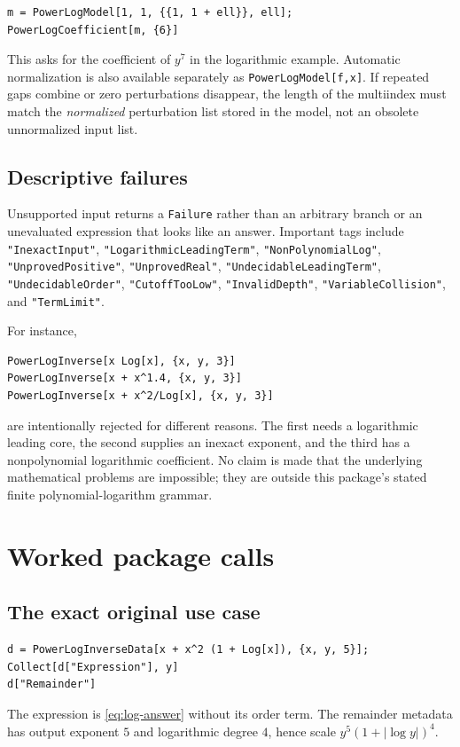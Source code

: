 \documentclass[11pt,a4paper]{article}
\theoremstyle{definition}
\theoremstyle{remark}
\newcommand{\code}[1]{\texttt{#1}}
\begin{document}
\begin{lstlisting}
m = PowerLogModel[1, 1, {{1, 1 + ell}}, ell];
PowerLogCoefficient[m, {6}]
\end{lstlisting}
This asks for the coefficient of $y^7$ in the logarithmic example. Automatic
normalization is also available separately as \code{PowerLogModel[f,x]}.
If repeated gaps combine or zero perturbations disappear, the length of the
multiindex must match the \emph{normalized} perturbation list stored in the
model, not an obsolete unnormalized input list.

\subsection{Descriptive failures}

Unsupported input returns a \code{Failure} rather than an arbitrary branch or
an unevaluated expression that looks like an answer. Important tags include
\code{"InexactInput"}, \code{"LogarithmicLeadingTerm"},
\code{"NonPolynomialLog"}, \code{"UnprovedPositive"},
\code{"UnprovedReal"}, \code{"UndecidableLeadingTerm"},
\code{"UndecidableOrder"}, \code{"CutoffTooLow"},
\code{"InvalidDepth"}, \code{"VariableCollision"}, and
\code{"TermLimit"}.

For instance,
\begin{lstlisting}
PowerLogInverse[x Log[x], {x, y, 3}]
PowerLogInverse[x + x^1.4, {x, y, 3}]
PowerLogInverse[x + x^2/Log[x], {x, y, 3}]
\end{lstlisting}
are intentionally rejected for different reasons. The first needs a
logarithmic leading core, the second supplies an inexact exponent, and the
third has a nonpolynomial logarithmic coefficient. No claim is made that the
underlying mathematical problems are impossible; they are outside this
package's stated finite polynomial-logarithm grammar.

\section{Worked package calls}
\label{sec:calls}

\subsection{The exact original use case}

\begin{lstlisting}
d = PowerLogInverseData[x + x^2 (1 + Log[x]), {x, y, 5}];
Collect[d["Expression"], y]
d["Remainder"]
\end{lstlisting}
The expression is \eqref{eq:log-answer} without its order term. The remainder
metadata has output exponent $5$ and logarithmic degree $4$, hence scale
$y^5(1+|\log y|)^4$.
\end{document}

